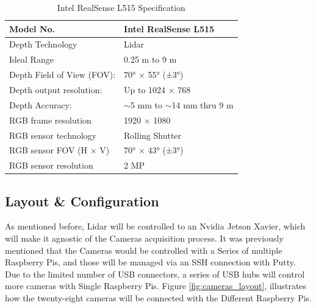\documentclass[12pt]{report}
\begin{document}
\begin{table}[H]
    \centering
    \begin{tabular}{|l|l|}
    \hline
    Model No.                  & Intel RealSense L515               \\ \hline
    Depth Technology           & Lidar                              \\ \hline
    Ideal Range                & 0.25 m to 9 m                      \\ \hline
    Depth Field of View (FOV): & 70° × 55° (±3°)                    \\ \hline
    Depth output resolution:   & Up to 1024 × 768                   \\ \hline
    Depth Accuracy:            & $\sim$5 mm to $\sim$14 mm thru 9 m \\ \hline
    RGB frame resolution       & 1920 × 1080                        \\ \hline
    RGB sensor technology      & Rolling Shutter                    \\ \hline
    RGB sensor FOV (H × V)     & 70° × 43° (±3°)                    \\ \hline
    RGB sensor resolution      & 2 MP                               \\ \hline
    \end{tabular}
    \caption{Intel RealSense L515 Specification}
    \label{tab:lidar_specs}
\end{table}







\subsection{Layout \& Configuration}
As mentioned before, Lidar will be controlled to an Nvidia Jetson Xavier, which will make it agnostic of the Cameras acquisition process. 
It was previously mentioned that the Cameras would be controlled with a Series of multiple Raspberry Pis, and those will be managed via an SSH connection with Putty. 
Due to the limited number of USB connectors, a series of USB hubs will control more cameras with Single Raspberry Pis.
Figure \ref{fig:cameras_layout}, illustrates how the twenty-eight cameras will be connected with the Different Raspberry Pis.
\end{document}
